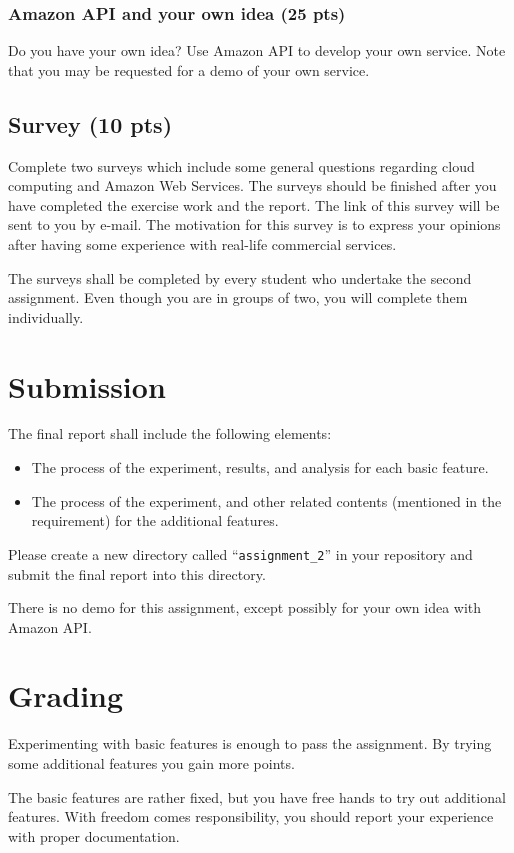 \documentclass[12pt, a4paper]{article}
\begin{document}
\subsubsection{Amazon API and your own idea (25 pts)}
Do you have your own idea?
Use Amazon API to develop your own service.
Note that you may be requested for a demo of your own service.

\subsection{Survey (10 pts)}
Complete two surveys which include some general questions regarding cloud computing and Amazon Web Services.
The surveys should be finished after you have completed the exercise work and the report.
The link of this survey will be sent to you by e-mail.
The motivation for this survey is to express your opinions after having some experience with real-life commercial services.

The surveys shall be completed by every student who undertake the second assignment.
Even though you are in groups of two, you will complete them individually.

\section{Submission}
The final report shall include the following elements:

\begin{itemize}
\item The process of the experiment, results, and analysis for each basic feature.
\item The process of the experiment, and other related contents (mentioned in the requirement) for the additional features.
\end{itemize}

Please create a new directory called ``\texttt{assignment\_2}'' in your repository and submit the final report into this directory.

There is no demo for this assignment, except possibly for your own idea with Amazon API.

\section{Grading}
Experimenting with basic features is enough to pass the assignment.
By trying some additional features you gain more points.

The basic features are rather fixed, but you have free hands to try out additional features.
With freedom comes responsibility, you should report your experience with proper documentation.
\end{document}
